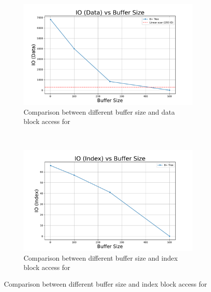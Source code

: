 \begin{figure}[h]
    \centering
    \begin{subfigure}[t]{0.45\textwidth}
        \centering
        \includegraphics[width=0.95\linewidth]{figures/block_io_vs_buffer_size.pdf}
        \caption{Comparison between different buffer size and data block access for \bplustree}
    \end{subfigure}%
    ~
    \begin{subfigure}[t]{0.45\textwidth}
        \centering
        \includegraphics[width=0.95\linewidth]{figures/index_io_vs_buffer_size.pdf}
        \caption{Comparison between different buffer size and index block access for \bplustree}
    \end{subfigure}
    \vspace{3mm}


\end{figure}
